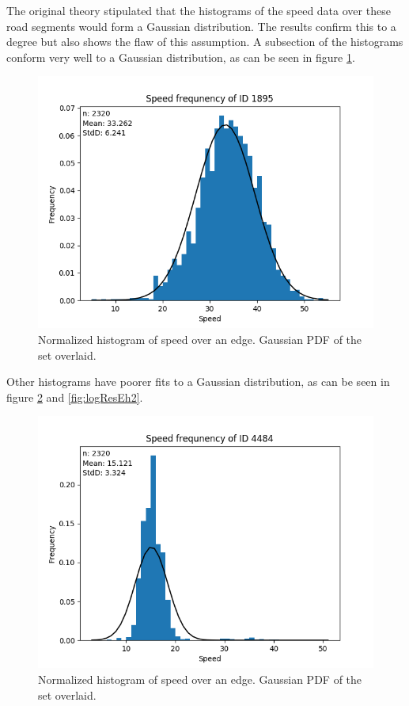 \documentclass{article}
\begin{document}
				The original theory stipulated that the histograms of the speed data over these road segments would form a Gaussian distribution. The results confirm this to a degree but also shows the flaw of this assumption. A subsection of the histograms conform very well to a Gaussian distribution, as can be seen in figure \ref{fig:logResGood}.
				\begin{figure}[H]
					\includegraphics[scale=0.5]{logResGood.png}
					\caption{Normalized histogram of speed over an edge. Gaussian PDF of the set overlaid.}
					\label{fig:logResGood}
				\end{figure}

				Other histograms have poorer fits to a Gaussian distribution, as can be seen in figure \ref{fig:logResEh1} and \ref{fig:logResEh2}.

				\begin{figure}[H]
					\includegraphics[scale=0.5]{logResEh1.png}
					\caption{Normalized histogram of speed over an edge. Gaussian PDF of the set overlaid.}
					\label{fig:logResEh1}
				\end{figure}
\end{document}

